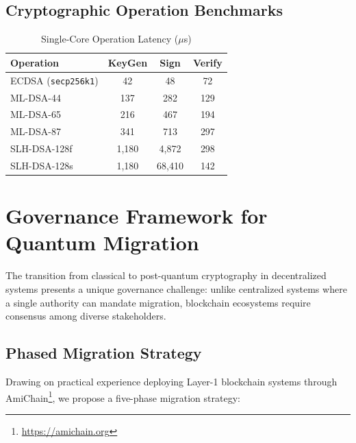 \documentclass[12pt, a4paper, twocolumn]{article}
\begin{document}
\subsection{Cryptographic Operation Benchmarks}

\begin{table}[H]
\centering
\caption{Single-Core Operation Latency ($\mu$s)}
\label{tab:latency}
\begin{tabular}{lccc}
\toprule
\textbf{Operation} & \textbf{KeyGen} & \textbf{Sign} & \textbf{Verify} \\
\midrule
ECDSA (\texttt{secp256k1}) & 42 & 48 & 72 \\
ML-DSA-44              & 137 & 282 & 129 \\
ML-DSA-65              & 216 & 467 & 194 \\
ML-DSA-87              & 341 & 713 & 297 \\
SLH-DSA-128f           & 1,180 & 4,872 & 298 \\
SLH-DSA-128s           & 1,180 & 68,410 & 142 \\
\bottomrule
\end{tabular}
\end{table}

\section{Governance Framework for Quantum Migration}
\label{sec:governance}

The transition from classical to post-quantum cryptography in decentralized systems presents a unique governance challenge: unlike centralized systems where a single authority can mandate migration, blockchain ecosystems require consensus among diverse stakeholders.

\subsection{Phased Migration Strategy}

Drawing on practical experience deploying Layer-1 blockchain systems through AmiChain\footnote{\url{https://amichain.org}}, we propose a five-phase migration strategy:
\end{document}
